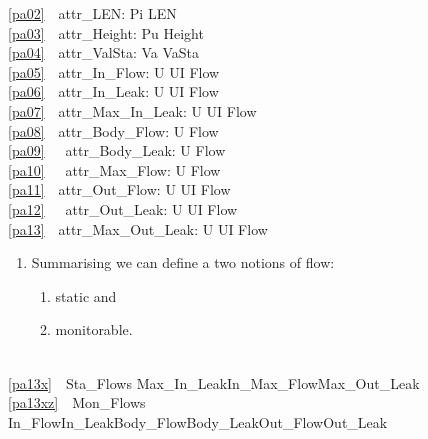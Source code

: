 \begin{multicols}{2}
\ref{pa02}\ \ attr\_LEN: Pi {\RIGHTARROW} LEN\ \ \ \\
\ref{pa03}\ \ attr\_Height: Pu {\RIGHTARROW} Height\\
\ref{pa04}\ \ attr\_ValSta: Va {\RIGHTARROW} VaSta\\
\ref{pa05}\ \ attr\_In\_Flow: U {\RIGHTARROW} UI {\RIGHTARROW} Flow\\
\ref{pa06}\ \ attr\_In\_Leak: U {\RIGHTARROW} UI {\RIGHTARROW} Flow \ \ \\
\ref{pa07}\ \ attr\_Max\_In\_Leak: U {\RIGHTARROW} UI {\RIGHTARROW} Flow \ \ \\
\ref{pa08}\ \ attr\_Body\_Flow: U {\RIGHTARROW} Flow \ \ \ \ \\
\ref{pa09}\ \ \ attr\_Body\_Leak: U {\RIGHTARROW} Flow\ \ \\
\ref{pa10}\ \ \ attr\_Max\_Flow: U {\RIGHTARROW} Flow\ \ \\
\ref{pa11}\ \ attr\_Out\_Flow: U {\RIGHTARROW} UI {\RIGHTARROW} Flow\ \ \\
\ref{pa12}\ \ \ attr\_Out\_Leak: U {\RIGHTARROW} UI {\RIGHTARROW} Flow  \\
\ref{pa13}\ \ attr\_Max\_Out\_Leak: U {\RIGHTARROW} UI {\RIGHTARROW} Flow
\ep
\end{multicols}

\mnewfoil\HHHH
\begin{enumerate}\setei
\item \label{pa13xy} Summarising we can define a two notions of flow:
\begin{enumerate}
\item \label{pa13x} static and
\item \label{pa13xz} monitorable.
\savei\end{enumerate}
\savei\end{enumerate}\footnotesize\small\LLLL
\bp
{}\\
\ref{pa13x}\ \ Sta\_Flows {\EQ} Max\_In\_Leak{\TIMES}In\_Max\_Flow{\GT}Max\_Out\_Leak\\
\ref{pa13xz}\ \ Mon\_Flows {\EQ} In\_Flow{\TIMES}In\_Leak{\TIMES}Body\_Flow{\TIMES}Body\_Leak{\TIMES}Out\_Flow{\TIMES}Out\_Leak
\ep
\normalsize
\mnewfoil

